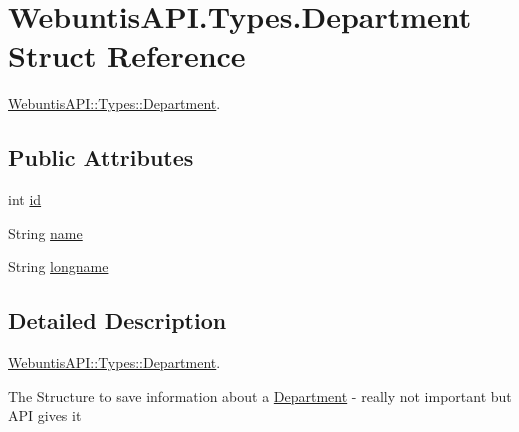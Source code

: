 \hypertarget{struct_webuntis_a_p_i_1_1_types_1_1_department}{\section{Webuntis\-A\-P\-I.\-Types.\-Department Struct Reference}
\label{struct_webuntis_a_p_i_1_1_types_1_1_department}
}


\hyperlink{struct_webuntis_a_p_i_1_1_types_1_1_department}{Webuntis\-A\-P\-I\-::\-Types\-::\-Department}.  


\subsection*{Public Attributes}
\begin{DoxyCompactItemize}
\item 
int \hyperlink{struct_webuntis_a_p_i_1_1_types_1_1_department_a543d6d34378c9649d7cf72ea88bfbb61}{id}
\item 
String \hyperlink{struct_webuntis_a_p_i_1_1_types_1_1_department_aa2a3990003b54bc6a9946be1c2ab5572}{name}
\item 
String \hyperlink{struct_webuntis_a_p_i_1_1_types_1_1_department_ac9d9a76d977fbdccfd18a7f88c88fbac}{longname}
\end{DoxyCompactItemize}


\subsection{Detailed Description}
\hyperlink{struct_webuntis_a_p_i_1_1_types_1_1_department}{Webuntis\-A\-P\-I\-::\-Types\-::\-Department}. 

The Structure to save information about a \hyperlink{struct_webuntis_a_p_i_1_1_types_1_1_department}{Department} -\/ really not important but A\-P\-I gives it 

